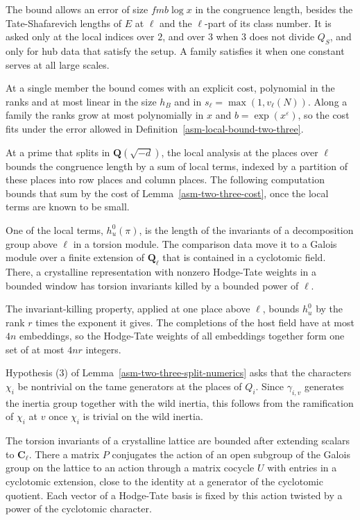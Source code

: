The bound allows an error of size $fmb\log x$ in the congruence length, besides
the Tate-Shafarevich lengths of $E$ at $\ell$ and the $\ell$-part of its class
number. It is asked only at the local indices over $2$, and over $3$ when $3$
does not divide $Q_S$, and only for hub data that satisfy the setup. A family
satisfies it when one constant serves at all large scales.

At a single member the bound comes with an explicit cost, polynomial in the
ranks and at most linear in the size $h_B$ and in $s_\ell=\max(1,v_\ell(N))$. Along
a family the ranks grow at most polynomially in $x$ and $b=\exp(x^{\varepsilon})$,
so the cost fits under the error allowed in
Definition~\ref{asm-local-bound-two-three}.

At a prime that splits in $\mathbf Q(\sqrt{-d})$, the local analysis at the
places over $\ell$ bounds the congruence length by a sum of local terms, indexed
by a partition of these places into row places and column places. The
following computation bounds that sum by the cost of
Lemma~\ref{asm-two-three-cost}, once the local terms are known to be small.

One of the local terms, $h^0_u(\pi)$, is the length of the invariants of a
decomposition group above $\ell$ in a torsion module. The comparison data move
it to a Galois module over a finite extension of $\mathbf Q_\ell$ that is
contained in a cyclotomic field. There, a crystalline representation with
nonzero Hodge-Tate weights in a bounded window has torsion invariants killed by
a bounded power of $\ell$.

The invariant-killing property, applied at one place above $\ell$, bounds
$h^0_u$ by the rank $r$ times the exponent it gives. The completions of the
host field have at most $4n$ embeddings, so the Hodge-Tate weights of all
embeddings together form one set of at most $4nr$ integers.

Hypothesis (3) of Lemma~\ref{asm-two-three-split-numerics} asks that the
characters $\chi_i$ be nontrivial on the tame generators at the places of
$Q_i$. Since $\gamma_{i,v}$ generates the inertia group together with the wild
inertia, this follows from the ramification of $\chi_i$ at $v$ once $\chi_i$ is
trivial on the wild inertia.

The torsion invariants of a crystalline lattice are bounded after extending
scalars to $\mathbf C_\ell$. There a matrix $P$ conjugates the action of an open
subgroup of the Galois group on the lattice to an action through a matrix
cocycle $U$ with entries in a cyclotomic extension, close to the identity at a
generator of the cyclotomic quotient. Each vector of a Hodge-Tate basis is fixed
by this action twisted by a power of the cyclotomic character.

